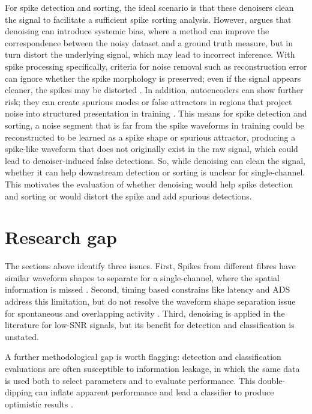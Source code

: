 \documentclass[ %
                    author={Rzan Alkabier},
                    supervisor={Dr. Zahraa Abdallah},
                    degree={MSc},
                     title={Denoising Extracellular Recording for Spike Detection and Classification on Single Channels},
                    subtitle={Does denoising improve detection and classification performance?},
                      type={},
                      year={2026}]{dissertation}
\begin{document}
\noindent
For spike detection and sorting, the ideal scenario is that these denoisers clean the signal to facilitate a sufficient spike sorting analysis. However, \cite{kay_risk_2022} argues that denoising can introduce systemic bias, where a method can improve the correspondence between the noisy dataset and a ground truth measure, but in turn distort the underlying signal, which may lead to incorrect inference. With spike processing specifically, criteria for noise removal such as reconstruction error can ignore whether the spike morphology is preserved; even if the signal appears cleaner, the spikes may be distorted \cite{baldazzi_systematic_2020}. In addition, autoencoders can show further risk; they can create spurious modes or false attractors in regions that project noise into structured presentation in training \cite{bengio_generalized_2013}. This means for spike detection and sorting, a noise segment that is far from the spike waveforms in training could be reconstructed to be learned as a spike shape or spurious attractor, producing a spike-like waveform that does not originally exist in the raw signal, which could lead to denoiser-induced false detections. So, while denoising can clean the signal, whether it can help downstream detection or sorting is unclear for single-channel. This motivates the evaluation of whether denoising would help spike detection and sorting or would distort the spike and add spurious detections. 
\bigskip

\noindent
\section{Research gap}
\label{sec:research_gap}
The sections above identify three issues. First, Spikes from different fibres have similar waveform shapes to separate for a single-channel, where the spatial information is missed \cite{hill_quality_2011, pedreira_how_2012, troglio_hybrid_2026}. Second, timing based constrains like latency and ADS address this limitation, but do not resolve the waveform shape separation issue for spontaneous and overlapping activity \cite{troglio_hybrid_2026}. Third, denoising is applied in the literature for low-SNR signals, but its benefit for detection and classification is unstated.
\bigskip

\noindent
A further methodological gap is worth flagging: detection and classification evaluations are often susceptible to information leakage, in which the same data is used both to select parameters and to evaluate performance. This double-dipping can inflate apparent performance and lead a classifier to produce optimistic results \cite{kriegeskorte_circular_2009}.
\bigskip
\end{document}
